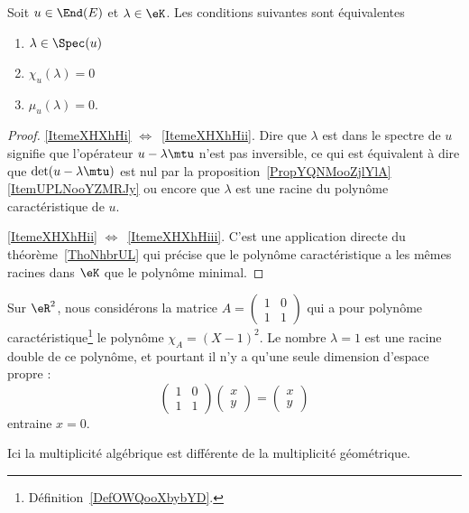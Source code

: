 \begin{theorem} \label{ThoWDGooQUGSTL}
	Soit \( u\in\End(E)\) et \( \lambda\in\eK\). Les conditions suivantes sont équivalentes
	\begin{enumerate}
		\item\label{ItemeXHXhHi}
		      \( \lambda\in\Spec(u)\)
		\item\label{ItemeXHXhHii}
		      \( \chi_u(\lambda)=0\)
		\item\label{ItemeXHXhHiii}
		      \( \mu_u(\lambda)=0\).
	\end{enumerate}
\end{theorem}

\begin{proof}
	\ref{ItemeXHXhHi} \( \Leftrightarrow\)~\ref{ItemeXHXhHii}. Dire que \( \lambda\) est dans le spectre de \( u\) signifie que l'opérateur \( u-\lambda\mtu\) n'est pas inversible, ce qui est équivalent à dire que \( \det(u-\lambda\mtu)\) est nul par la proposition~\ref{PropYQNMooZjlYlA}\ref{ItemUPLNooYZMRJy} ou encore que \( \lambda\) est une racine du polynôme caractéristique de \( u\).

	\ref{ItemeXHXhHii} \( \Leftrightarrow\)~\ref{ItemeXHXhHiii}. C'est une application directe du théorème~\ref{ThoNhbrUL} qui précise que le polynôme caractéristique a les mêmes racines dans \(\eK\) que le polynôme minimal.
\end{proof}

\begin{example} \label{ExICOJcFp}
	Sur \( \eR^2\), nous considérons la matrice \( A=\begin{pmatrix}
		1 & 0 \\
		1 & 1
	\end{pmatrix}\) qui a pour polynôme caractéristique\footnote{Définition~\ref{DefOWQooXbybYD}.} le polynôme \( \chi_A=(X-1)^2\). Le nombre \( \lambda=1\) est une racine double de ce polynôme, et pourtant il n'y a qu'une seule dimension d'espace propre :
	\begin{equation}
		\begin{pmatrix}
			1 & 0 \\
			1 & 1
		\end{pmatrix}\begin{pmatrix}
			x \\
			y
		\end{pmatrix}=\begin{pmatrix}
			x \\
			y
		\end{pmatrix}
	\end{equation}
	entraine \( x=0\).

	Ici la multiplicité algébrique est différente de la multiplicité géométrique.
\end{example}

